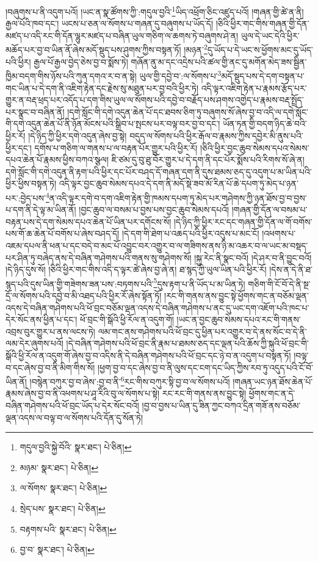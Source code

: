 །བཞུགས་པ་ནི་འདུག་པའོ། །ཡང་ན་སྣ་ཚོགས་ཀྱི་:གདུལ་བྱའི་\footnote{གདུལ་བྱའི་སྐྱེ་བོའི་  སྣར་ཐང་།  པེ་ཅིན། }ཡིད་འཕྲོག་ཅིང་འཛུད་པའོ། །གཞན་གྱི་ཚེ་ན་ནི། རྒྱལ་པོའི་ཁབ་དང་། ཡངས་པ་ཅན་ལ་སོགས་པ་གཞན་དུ་བཞུགས་པ་ཡོད་དོ། །ཅིའི་ཕྱིར་གང་གིས་གཞན་གྱི་དོན་མཛད་པ་འདི་རང་གི་དོན་ལྷུར་མཛད་པ་བཞིན་ཡུལ་གཅིག་ལ་ཆགས་ཏེ་བཞུགས་ཤེ་ན། ཡུལ་དེ་ཡང་དེའི་ཕྱིར་མཆོད་པར་བྱ་བ་ཡིན་ནོ་ཞེས་མདོ་སྡུད་པས་ཤུགས་ཀྱིས་བསྟན་ཏོ། །མཉན་\footnote{མཉམ་  སྣར་ཐང་།  པེ་ཅིན། }དུ་ཡོད་པ་དེ་ཡང་ས་ཕྱོགས་མང་དུ་ཡོད་པའི་ཕྱིར། རྒྱལ་པོ་རྒྱལ་བྱེད་ཅེས་བྱ་བ་སྨོས་ཏེ། གཞོན་ནུ་མ་དང་འདྲེས་པའི་ཚལ་གྱི་ནང་དུ་མགོན་མེད་ཟས་སྦྱིན་ཁྱིམ་བདག་གིས་ཉོས་པའི་ཀུན་དགའ་ར་བ་ན་སྟེ། ཡུལ་གྱི་དབྱེ་བ་:ལ་སོགས་པ་\footnote{ལ་སོགས་  སྣར་ཐང་།  པེ་ཅིན། }མདོ་སྡུད་པས་དེ་དག་བསྟན་པ་གང་ཡིན་པ་དེ་དག་ནི་འཇིག་རྟེན་དང་རྗེས་སུ་མཐུན་པར་བྱ་བའི་ཕྱིར་ཏེ། འདི་ལྟར་འཇིག་རྟེན་པ་རྣམས་རྩོད་པར་གྱུར་ན་བརྡ་ཕྲད་པར་འདོད་པ་དག་གིས་ཡུལ་ལ་སོགས་པའི་དབྱེ་བ་བརྗོད་པས་ཤགས་འགྱེད་པ་རྣམས་བརྡ་སྤྲོད་པར་སྣང་བ་བཞིན་ནོ། །དགེ་སློང་གི་དགེ་འདུན་ཆེན་པོ་དང་ཐབས་ཅིག་ཏུ་བཞུགས་སོ་ཞེས་བྱ་བ་འདི་ལ་དགེ་སློང་གི་དགེ་འདུན་ཆེན་པོ་ནི་ཉོན་མོངས་པའི་སྒྲིབ་པ་སྤངས་པར་བལྟ་བར་བྱ་བ་དང་། ཡོན་ཏན་གྱི་བདག་ཉིད་ཆེ་བའི་ཕྱིར་རོ། །དེ་ཉིད་ཀྱི་ཕྱིར་དགེ་འདུན་ཞེས་བྱ་སྟེ། བདུད་ལ་སོགས་པའི་ཕྱིར་རྒོལ་བ་རྣམས་ཀྱིས་དབྱེར་མི་ནུས་པའི་ཕྱིར་དང་། དགོས་པ་གཅིག་ལ་གནས་པ་ལ་བརྟན་པོར་གྱུར་པའི་ཕྱིར་རོ། །ཅིའི་ཕྱིར་བྱང་ཆུབ་སེམས་དཔའ་སེམས་དཔའ་ཆེན་པོ་རྣམས་ཕྱིས་བཀའ་སྩལ། ཇི་ཙམ་དུ་བུ་ཐུ་བོར་གྱུར་པ་དེ་དག་ནི་དང་པོར་སྨོས་པའི་རིགས་སོ་ཞེ་ན། དགེ་སློང་གི་དགེ་འདུན་ནི་རྟག་པའི་ཕྱིར་དང་པོར་བཤད་དོ་གཞན་དག་ནི་དུས་ཐམས་ཅད་དུ་འདུག་པ་མ་ཡིན་པའི་ཕྱིར་ཕྱིས་བསྟན་ཏེ། འདི་ལྟར་བྱང་ཆུབ་སེམས་དཔའ་དེ་དག་ནི་མདོ་སྡེ་ཟབ་མོ་རིན་པོ་ཆེ་དཔག་ཏུ་མེད་པ་ཉན་པར་:བྱེད་པས་\footnote{སྲེད་པས་  སྣར་ཐང་།  པེ་ཅིན། }ན་འདི་ལྟར་དགེ་བ་དག་འཇིག་རྟེན་གྱི་ཁམས་དཔག་ཏུ་མེད་པར་གཤེགས་ཀྱི་ཉན་ཐོས་བྱ་བ་བྱས་པ་དག་ནི་དེ་ལྟ་མ་ཡིན་ནོ། །བྱང་ཆུབ་ལ་བསམ་པ་བྱས་པས་བྱང་ཆུབ་སེམས་དཔའོ། །གཞན་གྱི་དོན་ལ་བསམ་པ་བརྟན་པས་དེ་དག་སེམས་དཔའ་ཆེན་པོ་ཡིན་པར་དགོངས་སོ། །དེ་ཉིད་ཀྱི་ཕྱིར་རང་དང་གཞན་གྱི་དོན་ལ་གོ་བགོས་པས་གོ་ཆ་ཆེན་པོ་བགོས་པ་ཞེས་བཤད་དོ། །དེ་དག་གི་ཐེག་པ་འཆད་པའི་ཕྱིར་འདུས་པ་མང་ངོ། །འཕགས་པ་འཇམ་དཔལ་ནི་ཕན་པ་དང་བདེ་བ་མང་པོ་འབྱུང་བར་འགྱུར་བ་ལ་གཟིགས་ནས་ཉི་མ་འཆར་བ་ལ་ཡང་མ་བསྡད་པར་ཤིན་ཏུ་བཞེད་ནས་དེ་བཞིན་གཤེགས་པའི་གནས་སུ་གཤེགས་སོ། །སྐྱ་རེང་ནི་སྣང་བའོ། །དེ་ཤར་བ་ནི་བྱུང་བའོ། །དེ་ཉིད་དུས་སོ། །ཅིའི་ཕྱིར་གང་གིས་འདི་ད་ལྟར་ཚེ་ཞེས་བྱ་ཞེ་ན། ཐ་སྙད་ཀྱི་ཡུལ་ཡིན་པའི་ཕྱིར་རོ། །དེས་ན་དེ་ནི་ཐ་སྙད་པའི་དུས་ཡིན་གྱི་གཟེགས་ཟན་པས་:བཏགས་པའི་\footnote{བརྟགས་པའི་  སྣར་ཐང་།  པེ་ཅིན། }དུས་རྟག་པ་ནི་ཡོད་པ་མ་ཡིན་ཏེ། གཅིག་གི་ངོ་བོ་དེ་ནི་སྔ་དྲོ་ལ་སོགས་པའི་དབྱེ་བ་མི་འཐད་པའི་ཕྱིར་རོ་ཞེས་སྟོན་ཏོ། །རང་གི་གནས་ནས་བྱུང་སྟེ་ཕྱོགས་གང་ན་བཅོམ་ལྡན་འདས་དེ་བཞིན་གཤེགས་པའི་ཕོ་བྲང་བཅོམ་ལྡན་འདས་དེ་བཞིན་གཤེགས་པ་ནང་དུ་ཡང་དག་འཇོག་པའི་ཁང་པ་དེར་སོང་ནས་ཕྱིན་པ་དང་། ཕོ་བྲང་གི་སྒོའི་ཕྱི་རོལ་ན་འདུག་གོ། །ཡང་ན་བྱང་ཆུབ་སེམས་དཔའ་རང་གི་གནས་འབྲས་བུར་གྱུར་པ་ནས་ལངས་ཏེ། ལམ་གང་ནས་གཤེགས་པའི་ཕོ་བྲང་དུ་ཕྱིན་པར་འགྱུར་བ་དེ་ནས་སོང་བ་དེ་ནི་ལམ་དེར་ཞུགས་པའོ། །དེ་བཞིན་གཤེགས་པའི་ཕོ་བྲང་ནི་རྣམ་པ་ཐམས་ཅད་དང་ལྡན་པའི་ཆོས་ཀྱི་སྐུའི་ཕོ་བྲང་གི་སྒོའི་ཕྱི་རོལ་ན་འདུག་གོ་ཞེས་བྱ་བ་འདིས་ནི་དེ་བཞིན་གཤེགས་པའི་ཕོ་བྲང་དང་ཉེ་བ་ན་འདུག་པ་བསྟན་ཏོ། །བལྟ་བ་དང་ཞེས་བྱ་བ་ནི་མིག་གིས་སོ། །ཕྱག་བྱ་བ་དང་ཞེས་བྱ་བ་ནི་ལུས་དང་ངག་དང་ཡིད་ཀྱིས་རབ་ཏུ་འདུད་པའི་ངོ་བོ་ཡིན་ནོ། །བསྙེན་བཀུར་བྱ་བ་ཞེས་:བྱ་བ་ནི་\footnote{བྱ་བ་  སྣར་ཐང་།  པེ་ཅིན། }རང་གིས་བཀུར་སྟི་བྱ་བ་ལ་སོགས་པའོ། །གཞན་ཡང་ཉན་ཐོས་ཆེན་པོ་རྣམས་ཞེས་བྱ་བ་ནི་འཕགས་པ་ཤཱ་རིའི་བུ་ལ་སོགས་པ་སྟེ། རང་རང་གི་གནས་ནས་བྱུང་སྟེ། ཕྱོགས་གང་ན་དེ་བཞིན་གཤེགས་པའི་ཕོ་བྲང་ཡོད་པ་དེར་སོང་བའོ། །བྱ་བ་བྱས་པ་ཡིན་དུ་ཟིན་ཀྱང་བཀའ་དྲིན་གཟོ་ནས་བཅོམ་ལྡན་འདས་ལ་བལྟ་བ་ལ་སོགས་པའི་དོན་དུ་སོན་ཏེ། 